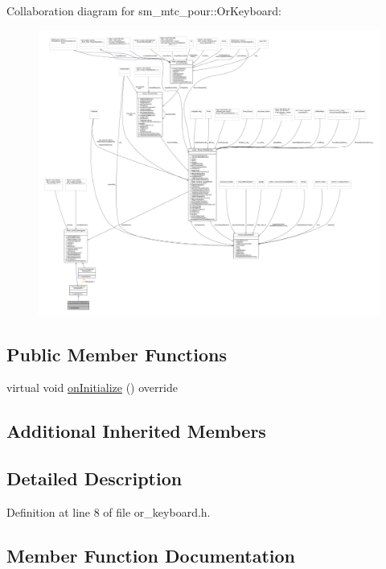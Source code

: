 Collaboration diagram for sm\+\_\+mtc\+\_\+pour\+:\+:Or\+Keyboard\+:
\nopagebreak
\begin{figure}[H]
\begin{center}
\leavevmode
\includegraphics[width=350pt]{classsm__mtc__pour_1_1OrKeyboard__coll__graph}
\end{center}
\end{figure}
\subsection*{Public Member Functions}
\begin{DoxyCompactItemize}
\item 
virtual void \hyperlink{classsm__mtc__pour_1_1OrKeyboard_a6f17edc9f087035c250370d80720c646}{on\+Initialize} () override
\end{DoxyCompactItemize}
\subsection*{Additional Inherited Members}


\subsection{Detailed Description}


Definition at line 8 of file or\+\_\+keyboard.\+h.



\subsection{Member Function Documentation}
